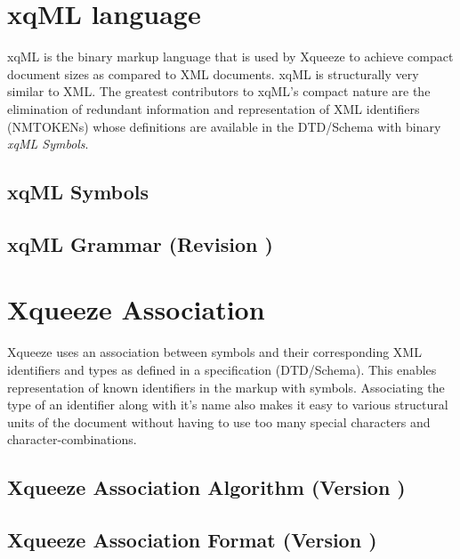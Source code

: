 \documentclass[a4paper]{article}
\begin{document}
\section{xqML language}

xqML is the binary markup language that is used by Xqueeze to achieve
compact document sizes as compared to XML documents. xqML is
structurally very similar to XML. The greatest contributors to xqML's
compact nature are the elimination of redundant information and
representation of XML identifiers (NMTOKENs) whose definitions are
available in the DTD/Schema with binary \textit{xqML Symbols}.

\subsection{xqML Symbols} \label{section:xqMLSymbols}




\subsection{xqML Grammar (Revision \xqMLver{})} \label{section:xqml-gram}


\section{Xqueeze Association}

Xqueeze uses an association between symbols and their corresponding
XML identifiers and types as defined in a specification
(DTD/Schema). This enables representation of known identifiers in the
markup with symbols. Associating the type of an identifier along with
it's name also makes it easy to various structural units of the
document without having to use too many special characters and
character-combinations.

\subsection{Xqueeze Association Algorithm (Version \xqAalgo{})} \label{section:xqa-algo}


\subsection{Xqueeze Association Format (Version \xqAfmt{})} \label{section:xqa-fmt}

\end{document}
